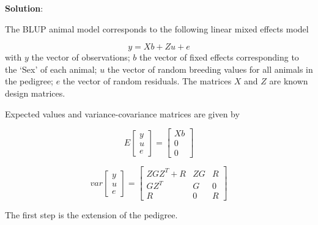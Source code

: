 \documentclass[
]{article}
\newcommand{\solstart}
{\vspace{3ex}\textbf{Solution}:}
\begin{document}
\solstart

The BLUP animal model corresponds to the following linear mixed effects
model

\[y = Xb + Zu +e\] with \(y\) the vector of observations; \(b\) the
vector of fixed effects corresponding to the `Sex' of each animal; \(u\)
the vector of random breeding values for all animals in the pedigree;
\(e\) the vector of random residuals. The matrices \(X\) and \(Z\) are
known design matrices.

Expected values and variance-covariance matrices are given by

\[E\left[\begin{array}{c}y \\ u \\ e \end{array} \right] = \left[\begin{array}{c}Xb \\ 0 \\ 0 \end{array} \right]\]

\[var\left[\begin{array}{c}y \\ u \\ e \end{array} \right] = 
\left[\begin{array}{ccc} ZGZ^T + R & ZG & R\\ GZ^T & G & 0 \\ R &  0 & R \end{array} \right]
\]

The first step is the extension of the pedigree.
\end{document}
